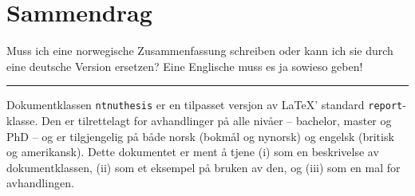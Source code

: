 \chapter*{Sammendrag}

Muss ich eine norwegische Zusammenfassung schreiben oder kann ich sie durch eine deutsche Version ersetzen? Eine Englische muss es ja sowieso geben!

\noindent\rule{\textwidth}{1pt}

Dokumentklassen \texttt{ntnuthesis} er en tilpasset versjon av \LaTeX' standard \texttt{report}-klasse. Den er tilrettelagt for avhandlinger på alle nivåer – bachelor, master og PhD – og er tilgjengelig på både norsk (bokmål og nynorsk) og engelsk (britisk og amerikansk). Dette dokumentet er ment å tjene (i) som en beskrivelse av dokument\-klassen, (ii) som et eksempel på bruken av den, og (iii) som en mal for avhandlingen.
